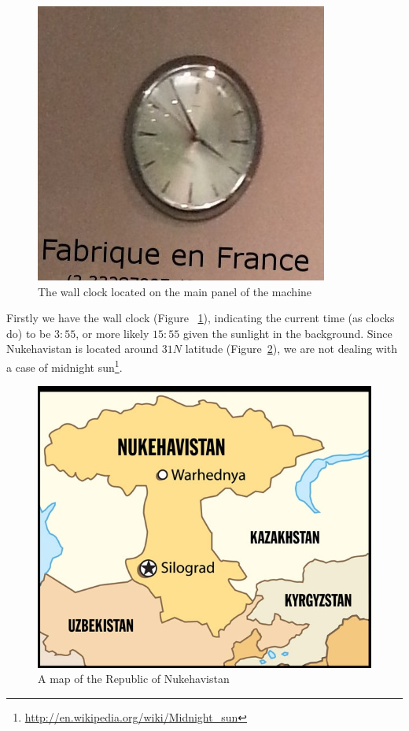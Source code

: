 \begin{figure}[h]
	\centering
	\includegraphics[width=0.8\columnwidth]{img/clock.jpg}
	\caption{The wall clock located on the main panel of the machine}
	\label{fig:clock}
\end{figure}

Firstly we have the wall clock (Figure ~\ref{fig:clock}), indicating the current time (as clocks do) to be $3:55$, or more likely $15:55$ given the sunlight in the background. Since Nukehavistan is located around $31N$ latitude (Figure~\ref{fig:map}), we are not dealing with a case of midnight sun\footnote{\url{http://en.wikipedia.org/wiki/Midnight_sun}}.

\begin{figure}
	\centering
	\includegraphics[width=0.8\columnwidth]{img/nukehavistan.jpg}
	\caption[A map of the Republic of Nukehavistan]{A map of the Republic of Nukehavistan \protect \footnotemark}
	\label{fig:map}
\end{figure}


